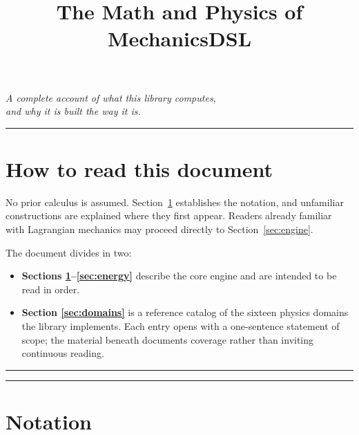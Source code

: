 \documentclass[11pt,a4paper]{article}
\title{\textbf{The Math and Physics of MechanicsDSL}}
\author{}
\date{}
\begin{document}

\maketitle
\vspace{-3.2em}
\begin{center}
\large\itshape A complete account of what this library computes,\\ and why it is built the way it is.
\end{center}
\vspace{1.4em}

\hrule
\vspace{1.2em}

\section*{How to read this document}

No prior calculus is assumed. Section~\ref{sec:notation} establishes the notation, and unfamiliar
constructions are explained where they first appear. Readers already familiar with Lagrangian
mechanics may proceed directly to Section~\ref{sec:engine}.

The document divides in two:

\begin{itemize}[leftmargin=1.4em,itemsep=0.3em]
  \item \textbf{Sections \ref{sec:notation}--\ref{sec:energy}} describe the core engine and are
        intended to be read in order.
  \item \textbf{Section \ref{sec:domains}} is a reference catalog of the sixteen physics domains
        the library implements. Each entry opens with a one-sentence statement of scope; the
        material beneath documents coverage rather than inviting continuous reading.
\end{itemize}

\vspace{0.8em}
\hrule
\vspace{0.6em}

\tableofcontents

\vspace{1.2em}
\hrule

\section{Notation}
\label{sec:notation}
\end{document}
